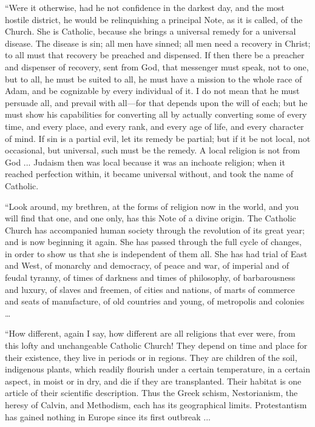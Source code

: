 ``Were it otherwise, had he not confidence in the
darkest day, and the most hostile district, he would be relinquishing
a principal Note, as it is called, of the Church. She is Catholic,
because she brings a universal remedy for a universal disease. The
disease is sin; all men have sinned; all men need a recovery in
Christ; to all must that recovery be preached and dispensed. If then
there be a preacher and dispenser of recovery, sent from God, that
messenger must speak, not to one, but to all, he must be suited to
all, he must have a mission to the whole race of Adam, and be
cognizable by every individual of it. I do not mean that he must
persuade all, and prevail with all—for that depends upon the will of
each; but he must show his capabilities for converting all by actually
converting some of every time, and every place, and every rank, and
every age of life, and every character of mind. If sin is a partial
evil, let its remedy be partial; but if it be not local, not
occasional, but universal, such must be the remedy. A local religion
is not from God ... Judaism then was local because it was an inchoate
religion; when it reached perfection within, it became universal
without, and took the name of Catholic.

``Look around, my brethren, at the forms of
religion now in the world, and you will find that one, and one only,
has this Note of a divine origin. The Catholic Church has accompanied
human society through the revolution of its great year; and is now
beginning it again. She has passed through the full cycle of changes,
in order to show us that she is independent of them all. She has had
trial of East and West, of monarchy and democracy, of peace and war,
of imperial and of feudal tyranny, of times of darkness and times of
philosophy, of barbarousness and luxury, of slaves and freemen, of
cities and nations, of marts of commerce and seats of manufacture, of
old countries and young, of metropolis and colonies …

``How different, again I say, how different are
all religions that ever were, from this lofty and unchangeable
Catholic Church! They depend on time and place for their existence,
they live in periods or in regions. They are children of the soil,
indigenous plants, which readily flourish under a certain temperature,
in a certain aspect, in moist or in dry, and die if they are
transplanted. Their habitat is one article of their scientific description. Thus the Greek schism, Nestorianism, the heresy of
Calvin, and Methodism, each has its geographical limits. Protestantism
has gained nothing in Europe since its first outbreak ...

